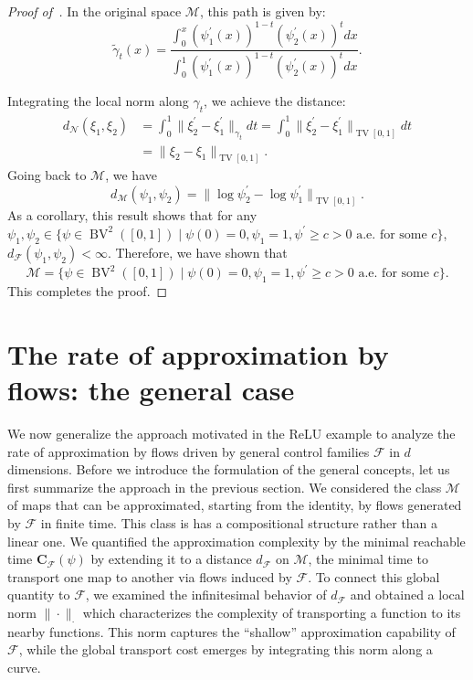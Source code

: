 \documentclass[12pt]{amsart}
\numberwithin{equation}{section}
\theoremstyle{remark}
\begin{document}
\begin{proof}[Proof of~]
In the original space $\mathcal M$, this path is given by:
\begin{equation}
    \label{eq:geodesic_1d}
    \tilde \gamma_t(x)  = \frac{\int_0^x(\psi_1^\prime(x))^{1-t}(\psi_2^\prime(x))^t dx}{\int_0^1 (\psi_1^\prime(x))^{1-t}(\psi_2^\prime(x))^t dx}.
\end{equation}

Integrating the local norm along $\gamma_t$, we achieve the distance:
\begin{equation}
    \begin{aligned}
            d_{\mathcal N}(\xi_1, \xi_2) &= \int_0^1 \|\xi_2^\prime - \xi_1^\prime\|_{\gamma_t} dt = \int_0^1 \|\xi_2^\prime - \xi_1^\prime\|_{\operatorname{TV}[0,1]} dt\\
            &= \|\xi_2 - \xi_1\|_{\operatorname{TV}[0,1]}.
    \end{aligned}
\end{equation}
Going back to $\mathcal M$, we have
\begin{equation}
    d_{\mathcal M}(\psi_1, \psi_2) = \|\log \psi_2^\prime - \log \psi_1^\prime\|_{\operatorname{TV}[0,1]}.
\end{equation}
As a corollary, this result shows that for any $\psi_1, \psi_2\in \{\psi\in \operatorname{BV}^2([0,1]) \mid \psi(0)=0, \psi_1 =1,  \psi^\prime \ge c > 0 \text{ a.e.}\text{ for some } c\}$, $d_{\mathcal F}(\psi_1, \psi_2) < \infty$. Therefore, we have shown that
\begin{equation}
    \mathcal M = \{\psi\in \operatorname{BV}^2([0,1]) \mid \psi(0)=0, \psi_1 =1,  \psi^\prime \ge c > 0 \text{ a.e.}\text{ for some } c\}.
\end{equation}
This completes the proof.
\end{proof}


\section{The rate of approximation by flows: the general case}

We now generalize the approach motivated in the ReLU example to
analyze the rate of approximation by flows driven by general
control families $\mathcal F$ in $d$ dimensions.
Before we introduce the formulation of the general concepts,
let us first summarize the approach in the previous section.
We considered the class $\mathcal M$ of maps that can be approximated, starting from the identity,
by flows generated by $\mathcal F$ in finite time. This class is has a compositional structure rather than a linear one.
We quantified the approximation complexity by the minimal reachable time
$\mathbf C_{\mathcal F}(\psi)$ by extending it to a distance
$d_{\mathcal F}$ on $\mathcal M$, the minimal time to transport one map to another via flows induced by $\mathcal F$.
To connect this global quantity to $\mathcal F$, we examined the infinitesimal behavior of
$d_{\mathcal F}$ and obtained a local norm $\|\cdot\|_{\cdot}$ which characterizes the
 complexity of transporting a function to its nearby functions.
This norm captures the “shallow” approximation capability of $\mathcal F$,
while the global transport cost emerges by integrating this norm along a curve.
\end{document}
